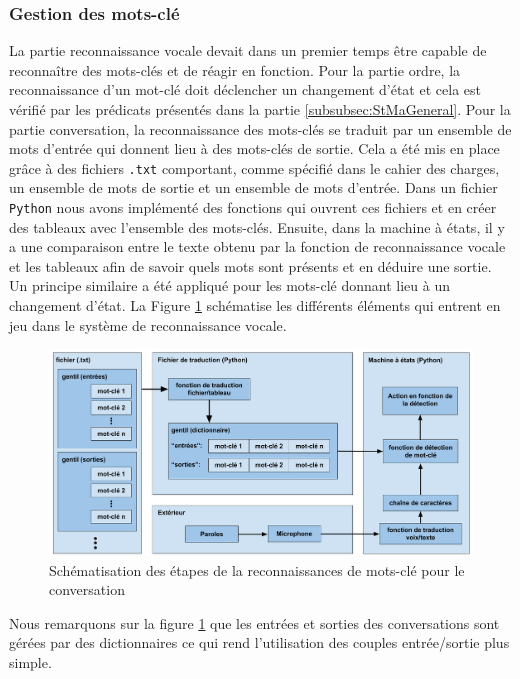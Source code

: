 \documentclass[a4paper,french]{article}
\begin{document}
\subsubsection{Gestion des mots-clé}    
La partie reconnaissance vocale devait dans un premier temps être capable de reconnaître des mots-clés et de réagir en fonction. Pour la partie ordre, la reconnaissance d'un mot-clé doit déclencher un changement d'état et cela est vérifié par les prédicats présentés dans la partie \ref{subsubsec:StMaGeneral}. Pour la partie conversation, la reconnaissance des mots-clés se traduit par un ensemble de mots d'entrée qui donnent lieu à des mots-clés de sortie. Cela a été mis en place grâce à des fichiers \texttt{.txt} comportant, comme spécifié dans le cahier des charges, un ensemble de mots de sortie et un ensemble de mots d'entrée. Dans un fichier \texttt{Python} nous avons implémenté des fonctions qui ouvrent ces fichiers et en créer des tableaux avec l'ensemble des mots-clés. Ensuite, dans la machine à états, il y a une comparaison entre le texte obtenu par la fonction de reconnaissance vocale et les tableaux afin de savoir quels mots sont présents et en déduire une sortie. Un principe similaire a été appliqué pour les mots-clé donnant lieu à un changement d'état. La Figure \ref{fig:keywords} schématise les différents éléments qui entrent en jeu dans le système de reconnaissance vocale. 

\begin{figure}[H]
    \centering
    \includegraphics[scale=0.35]{figures/keywords.png}
    \caption{Schématisation des étapes de la reconnaissances de mots-clé pour le conversation}
    \label{fig:keywords}
\end{figure}

Nous remarquons sur la figure \ref{fig:keywords} que les entrées et sorties des conversations sont gérées par des dictionnaires ce qui rend l'utilisation des couples entrée/sortie plus simple. \\
\end{document}
